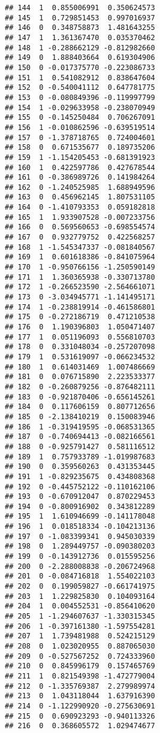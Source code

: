 \documentclass[
]{article}
\begin{document}
\begin{verbatim}
## 144  1  0.855006991  0.350624573
## 145  1  0.729851453  0.997016937
## 146  0  0.348758873  1.481643255
## 147  1  1.361367470  0.035370462
## 148  1 -0.288662129 -0.812982660
## 149  0  1.888403664  0.619304906
## 150  0 -0.017375770 -0.223086733
## 151  1  0.541082912  0.838647604
## 152  0 -0.540041112  0.647781775
## 153  0 -0.080849396 -0.119997799
## 154  1 -0.029633958 -0.238070949
## 155  0 -0.145250484  0.706267091
## 156  1 -0.010862596 -0.639519514
## 157  0 -1.378718765  0.724004601
## 158  0  0.671535677  0.189735206
## 159  1 -1.154205453 -0.681391923
## 160  1  0.422597786  0.427678544
## 161  0 -0.386989726  0.141984264
## 162  0 -1.240525985  1.688949596
## 163  0  0.456962145  1.807531105
## 164  0 -1.410793353  0.059182818
## 165  1  1.933907528 -0.007233756
## 166  0  0.569560653 -0.698554574
## 167  0  0.932779752  0.422568257
## 168  1 -1.545347337 -0.081840567
## 169  1  0.601618386 -0.841075964
## 170  1 -0.950766156 -1.250590149
## 171  1  1.360365938 -0.330713780
## 172  1 -0.266523590 -2.564661071
## 173  0 -3.034945771 -1.141495171
## 174  1 -0.238819914 -0.461586801
## 175  0 -0.272186719  0.471210538
## 176  0  1.190396803  1.050471407
## 177  1  0.051196093  0.556810703
## 178  0  0.331048034 -0.257207098
## 179  1  0.531619097 -0.066234532
## 180  1  0.614031469  1.007486669
## 181  0  0.076715890  2.223533377
## 182  0 -0.260879256 -0.876482111
## 183  0 -0.921870406 -0.656145261
## 184  0  0.117606159  0.807712656
## 185  0 -2.138410219  0.150083946
## 186  1 -0.319419595 -0.068531365
## 187  0 -0.740694413 -0.082166561
## 188  0 -0.925791427  0.581116512
## 189  1  0.757933789 -1.019987683
## 190  0  0.359560263  0.431353445
## 191  1 -0.829235675  0.434808368
## 192  0 -0.445752122 -0.110162106
## 193  0 -0.670912047  0.870229453
## 194  0 -0.800916902  0.343812289
## 195  1  1.610946699 -0.141178048
## 196  1  0.018518334 -0.104213136
## 197  0 -1.083399341  0.945030339
## 198  0  1.289449757 -0.090380203
## 199  0 -0.143912736  0.015595256
## 200  0 -2.288008838 -0.206724968
## 201  0 -0.084716818  1.554022103
## 202  0  0.199059827 -0.661741975
## 203  1  1.229825830  0.104093164
## 204  1  0.004552531 -0.856410620
## 205  1 -1.294607637 -1.330315345
## 206  1 -0.397161380 -1.597554281
## 207  1  1.739481988  0.524215129
## 208  0  1.023020955  0.887065030
## 209  0 -0.527567252  0.724333960
## 210  0  0.845996179  0.157465769
## 211  1  0.821549398 -1.472779004
## 212  0 -1.335769387  2.279989974
## 213  0  1.043118044  1.637916390
## 214  0 -1.122990920 -0.275630691
## 215  0  0.690923293 -0.940113326
## 216  0  0.368605572  1.029474677

\end{verbatim}
\end{document}
